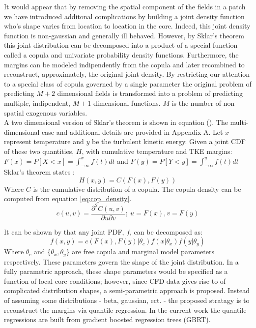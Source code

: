 It would appear that by removing the spatial component of the fields in a patch we have introduced additonal complications by building a joint density function who's shape varies from location to location in the core.  Indeed, this joint density function is non-gaussian and generally ill behaved.  However, by Sklar's theorem this joint distribution can be decomposed into a product of a special function called a copula and univariate probability density functions.  Furthermore, the margins can be modeled indipendently from the copula and later recombined to reconstruct, approximately, the original joint density.  By restricting our attention to a special class of copula governed by a single parameter the original problem of predicting $M+2$ dimensional fields is transformed into a problem of predicting multiple, indipendent, $M+1$ dimensional functions.  $M$ is the number of non-spatial exogenous variables. \\

A two dimensional version of Sklar's theorem is shown in equation ().  The multi-dimensional case and additional details are provided in Appendix A.  Let $x$ represent temperature and $y$ be the turbulent kinetic energy.
Given a joint CDF of these two quantities, $H$, with cumulative temperature and TKE margins: $F(x)=P[X < x] = \int_{-\infty}^{x}f(t)dt$
and $F(y)=P[Y < y] = \int_{-\infty}^{y}f(t)dt$ Sklar's theorem states \cite{Nelsen2006}:
\begin{equation}
H(x,y) = C(F(x), F(y))
\end{equation}
Where $C$ is the cumulative distribution of a copula.  The copula density can be computed from equation \ref{eq:cop_density}.
\begin{equation}
c(u, v) = \frac{\partial^2 C(u, v)}{\partial u \partial v};\ u=F(x), v=F(y)
\label{eq:cop_density}
\end{equation}

It can be shown by that any joint PDF, $f$, can be decomposed as:
\begin{equation}
f(x, y) = c(F(x), F(y)|\theta_c)f(x|\theta_x)f(y|\theta_y)
\end{equation}
Where $\theta_c$ and $\{\theta_{x}, \theta_{y}\}$ are free copula and marginal model parameters respectively.
These parameters govern the shape of the joint distribution.  In a fully parametric approach, these shape parameters would be specified as a function of local core conditions; however, since CFD data gives rise to of complicated distribution shapes, a semi-parametric approach is proposed.  Instead of assuming some distributions - beta, gaussian, ect. - the proposed stratagy is to reconstruct the margins via quantile regression.  In the current work the quantile regressions are built from gradient boosted regression trees (GBRT). 

